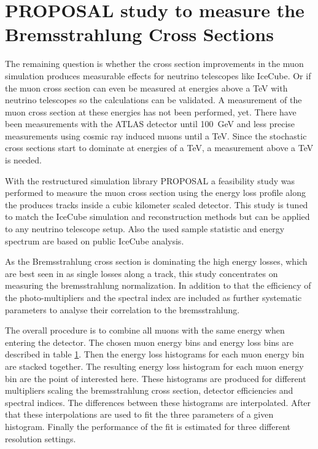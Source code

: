 \chapter{PROPOSAL study to measure the Bremsstrahlung Cross Sections}

The remaining question is whether the cross section improvements in the muon simulation produces measurable effects for neutrino telescopes like IceCube.\cite{Meier19ICRC}
Or if the muon cross section can even be measured at energies above a TeV with neutrino telescopes so the calculations can be validated.
A measurement of the muon cross section at these energies has not been performed, yet.
There have been measurements with the ATLAS detector until \SI{100}{GeV} and less precise measurements using cosmic ray induced muons until a TeV.
Since the stochastic cross sections start to dominate at energies of a TeV, a measurement above a TeV is needed.

With the restructured simulation library PROPOSAL a feasibility study was performed to measure the muon cross section using the energy loss profile along the produces tracks inside a cubic kilometer scaled detector.
This study is tuned to match the IceCube simulation and reconstruction methods but can be applied to any neutrino telescope setup.
Also the used sample statistic and energy spectrum are based on public IceCube analysis.

As the Bremsstrahlung cross section is dominating the high energy losses, which are best seen in as single losses along a track, this study concentrates on measuring the bremsstrahlung normalization.
In addition to that the efficiency of the photo-multipliers and the spectral index are included as further systematic parameters to analyse their correlation to the bremsstrahlung.

The overall procedure is to combine all muons with the same energy when entering the detector.
The chosen muon energy bins and energy loss bins are described in table \ref{}.
Then the energy loss histograms for each muon energy bin are stacked together.
The resulting energy loss histogram for each muon energy bin are the point of interested here.
These histograms are produced for different multipliers scaling the bremsstrahlung cross section, detector efficiencies and spectral indices.
The differences between these histograms are interpolated.
After that these interpolations are used to fit the three parameters of a given histogram.
Finally the performance of the fit is estimated for three different resolution settings.

